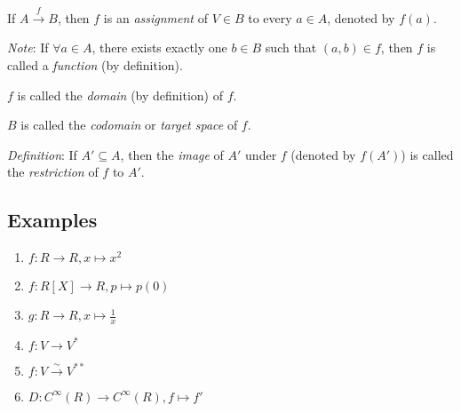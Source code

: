 \documentclass[12pt,a4paper]{article}
\begin{document}
If $A \overset{f}{\to} B$, then $f$ is an \textit{assignment} of $V \in B$ to every $a \in A$, denoted by $f(a)$.

\textit{Note}: If $\forall a \in A$, there exists exactly one $b \in B$ such that $(a, b) \in f$, then $f$ is called a \textit{function} (by definition).

$f$ is called the \textit{domain} (by definition) of $f$.

$B$ is called the \textit{codomain} or \textit{target space} of $f$.

\textit{Definition}: If $A' \subseteq A$, then the \textit{image} of $A'$ under $f$ (denoted by $f(A')$) is called the \textit{restriction} of $f$ to $A'$.

\subsection{Examples}

\begin{enumerate}
    \item $f: R \to R, x \mapsto x^2$
    \item $f: R[X] \to R, p \mapsto p(0)$
    \item $g: R \to R, x \mapsto \frac{1}{x}$
    \item $f: V \to V^*$
    \item $f: V \overset{\sim}{\to} V^{**}$
    \item $D: C^\infty(R) \to C^\infty(R), f \mapsto f'$
\end{enumerate}
\end{document}
